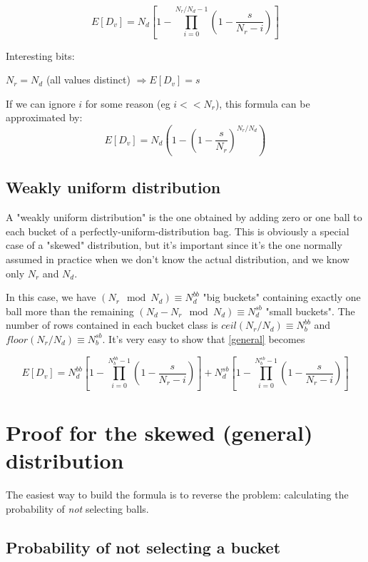 \documentclass[12pt]{article}
\begin{document}
\begin{equation}
E[D_v]=N_d
    \left[ 
          1- \prod_{i=0}^{N_r/N_d-1} 
          { \left(1 - \frac{s}{N_r-i} \right) 
          } 
    \right]
\end{equation}

Interesting bits:

$N_r=N_d$ (all values distinct) $\Rightarrow E[D_v]=s$

If we can ignore $i$ for some reason (eg $i << N_r$), this formula can be approximated by:
$$E[D_v]=N_d \left(1-{\left(1 - \frac{s}{N_r}\right)^{N_r/N_d}} \right)$$

\subsection{Weakly uniform distribution}

A "weakly uniform distribution" is the one obtained by adding zero or one
ball to each bucket of a perfectly-uniform-distribution bag. This is obviously a
special case of a "skewed" distribution, but it's important since it's the one
normally assumed in practice when we don't know the actual distribution, and we know only $N_r$ and $N_d$.

In this case, we have $({N_r \mod N_d})\equiv N_d^{bb}$ "big buckets" containing exactly one ball more than the remaining $(N_d - {N_r \mod N_d}) \equiv N_d^{sb}$ "small buckets". The number of rows contained in each bucket class is $ceil (N_r/N_d) \equiv N_b^{bb}$ and $floor(N_r/N_d)\equiv N_b^{sb}$. It's very easy to show that \eqref{general} becomes

\begin{equation}
E[D_v]=
N_d^{bb}
    \left[ 
          1- \prod_{i=0}^{N_b^{bb}-1} 
          { \left(1 - \frac{s}{N_r-i} \right) 
          } 
    \right]
    +
N_d^{sb}
    \left[ 
          1- \prod_{i=0}^{N_b^{sb}-1} 
          { \left(1 - \frac{s}{N_r-i} \right) 
          } 
    \right]    
\end{equation}

\pagebreak
\section{Proof for the skewed (general) distribution}

The easiest way to build the formula is to reverse the problem: calculating the probability of {\em not} selecting balls.

\subsection{Probability of not selecting a bucket}
\end{document}
